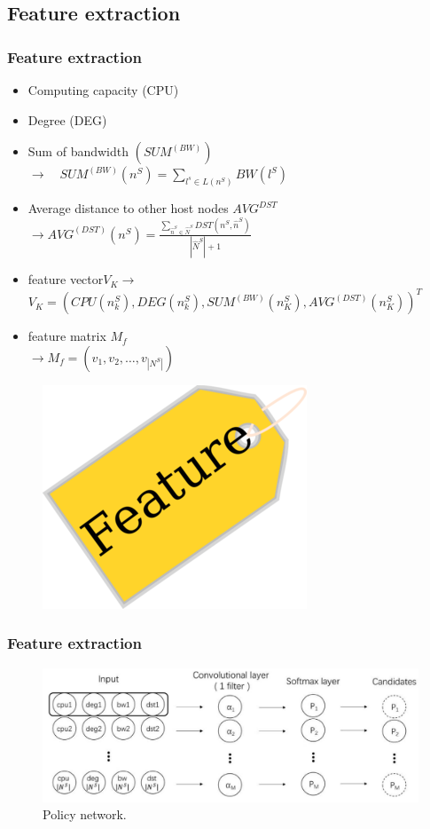 \documentclass{beamer}
\begin{document}
\subsection{Feature extraction}
\begin{frame}
	\frametitle{Feature extraction}
	\begin{itemize}
		\item {Computing capacity (CPU)}
		\item {Degree (DEG)\\}
		\item {Sum of bandwidth $(SUM^{(BW)})$ $ \to \quad SUM^{(BW)}(n^S)=\sum_{l^s \in L(n^S)}BW(l^S)$}
		\item {Average distance to other host nodes $AVG^{DST}$ $\to AVG^{(DST)}(n^S)=\frac{\sum_{\hat{n}^S \in \hat{N}^S}DST(n^S,\hat{n}^S)}{|\hat{N}^S|+1}$}
		\item {feature
			vector$V_K \to$\\$V_K=(CPU(n_k^S),DEG(n_k^S),SUM^{(BW)}(n_K^S),AVG^{(DST)}(n_K^S))^T$}
		\item {feature matrix $M_f$ \\
		$\to M_f=(v_1,v_2,\dots,v_{|N^S|})$}
	\end{itemize}
	
\begin{figure}
	\centering
	\includegraphics[width=0.21\linewidth]{../Images/feature2}
	\caption{}
	\label{fig:feature2}
\end{figure}
\end{frame}
\begin{frame}
\frametitle{Feature extraction}
\begin{figure}
	\centering
	\includegraphics[width=0.9\linewidth]{../Images/policyNetwork}
	\caption{Policy network.}
	\label{fig:policynetwork}
\end{figure}
\end{frame}
\end{document}
